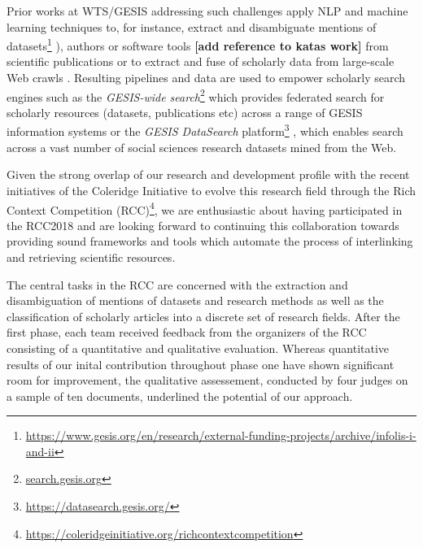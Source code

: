 Prior works at WTS/GESIS addressing such challenges apply NLP and machine learning techniques to, for instance, extract and disambiguate mentions of datasets\footnote{\url{https://www.gesis.org/en/research/external-funding-projects/archive/infolis-i-and-ii}} \cite{boland2012identifying,ghavimi2016semi}), authors \cite{conf/cikm/Backes18, conf/jcdl/Backes18} or software tools \textbf{[add reference to katas work]} from scientific publications or to extract and fuse of scholarly data from large-scale Web crawls \cite{journals/semweb/YuGFLRD19, sahoo2015analysing}. Resulting pipelines and data are used to empower scholarly search engines such as the \textit{GESIS-wide search}\footnote{\url{search.gesis.org}}  \cite{conf/jcdl/HienertKBZM19} which provides federated search for scholarly resources (datasets, publications etc) across a range of GESIS information systems or the \textit{GESIS DataSearch} platform\footnote{\url{https://datasearch.gesis.org/}} \cite{Krmer2018ADD}, which enables search across a vast number of social sciences research datasets mined from the Web. 

Given the strong overlap of our research and development profile with the recent initiatives of the Coleridge Initiative to evolve this research field through the Rich Context Competition (RCC)\footnote{\url{https://coleridgeinitiative.org/richcontextcompetition}}, we are enthusiastic about having participated in the RCC2018 and are looking forward to continuing this collaboration towards providing sound frameworks and tools which automate the process of interlinking and retrieving scientific resources.

The central tasks in the RCC are concerned with the extraction and disambiguation of mentions of datasets and research methods as well as the classification of scholarly articles into a discrete set of research fields. After the first phase, each team received feedback from the organizers of the RCC consisting of a quantitative and qualitative evaluation. Whereas quantitative results of our inital contribution throughout phase one have shown significant room for improvement, the qualitative assessement, conducted by four judges on a sample of ten documents, underlined the potential of our approach. 


